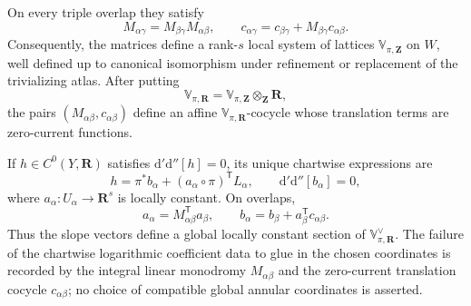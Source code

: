 \begin{proposition}
On every triple overlap they satisfy
\begin{equation}
\label{eq:p062-annular-affine-cocycle}
 M_{\alpha\gamma}=M_{\beta\gamma}M_{\alpha\beta},
 \qquad
 c_{\alpha\gamma}
 =c_{\beta\gamma}+M_{\beta\gamma}c_{\alpha\beta}.
\end{equation}
Consequently, the matrices define a rank-$s$ local system of lattices
$\mathbb{V}_{\pi,\mathbf Z}$ on $W$, well defined up to canonical
isomorphism under refinement or replacement of the trivializing atlas.
After putting
\[
 \mathbb{V}_{\pi,\mathbf R}
 =\mathbb{V}_{\pi,\mathbf Z}\otimes_{\mathbf Z}\mathbf R,
\]
the pairs $(M_{\alpha\beta},c_{\alpha\beta})$ define an affine
$\mathbb{V}_{\pi,\mathbf R}$-cocycle whose translation terms are
zero-current functions.

If $h\in C^0(Y,\mathbf R)$ satisfies
$\mathrm d'\mathrm d''[h]=0$, its unique chartwise expressions are
\begin{equation}
\label{eq:p062-annular-local-normal-form}
 h=\pi^*b_\alpha+
   (a_\alpha\circ\pi)^{\mathsf T}L_\alpha,
 \qquad
 \mathrm d'\mathrm d''[b_\alpha]=0,
\end{equation}
where $a_\alpha:U_\alpha\to\mathbf R^s$ is locally constant.  On overlaps,
\begin{equation}
\label{eq:p062-annular-coefficient-transition}
 a_\alpha=M_{\alpha\beta}^{\mathsf T}a_\beta,
 \qquad
 b_\alpha=b_\beta+a_\beta^{\mathsf T}c_{\alpha\beta}.
\end{equation}
Thus the slope vectors define a global locally constant section of
$\mathbb{V}_{\pi,\mathbf R}^\vee$.  The failure of the chartwise logarithmic
coefficient data to glue in the chosen coordinates is recorded by the
integral linear monodromy $M_{\alpha\beta}$ and the zero-current translation
cocycle $c_{\alpha\beta}$; no choice of compatible global annular coordinates
is asserted.
\end{proposition}
